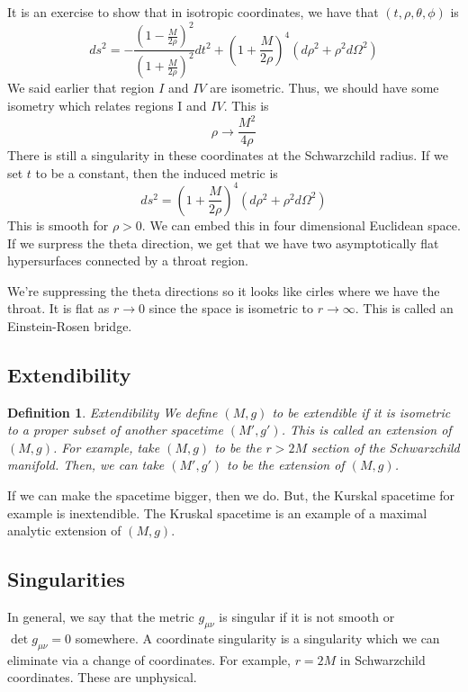 \documentclass[11pt, oneside]{article}   	%
\theoremstyle{slanted}
\newtheorem*{defn}{Definition}
\begin{document}
It is an exercise to show that 
in isotropic coordinates, 
we have that $ \left( t, \rho , \theta, \phi  \right)  $ 
is 
\[
ds ^ 2 =  - \frac{\left(  1- \frac{M}{2 \rho }  \right)  ^ 2 }{ 
\left(  1+ \frac{M}{2 \rho }  \right)  ^ 2 } dt ^ 2 
+ \left( 1 + \frac{M}{2 \rho }   \right)  ^ 4 
\left(  d \rho ^ 2 + \rho ^ 2 d \Omega^ 2  \right)  
\] We said earlier 
that region $ I  $ and $ I V $ are 
isometric. 
Thus, we should have some isometry which 
relates regions I and $ I V $. This is 
\[
\rho \to \frac{M^2}{4 \rho } 
\] There is still a singularity in 
these coordinates at the Schwarzchild radius. 
If we set $ t  $ to be a constant, 
then the induced metric 
is 
\[
ds ^2 = \left(  1 + \frac{M}{2 \rho }  \right)  ^ 4 
\left( d \rho ^ 2 + \rho ^ 2 d \Omega^ 2  \right) 
\] This is smooth for $ \rho > 0 $. 
We can embed this in four dimensional 
Euclidean space. 
If we surpress the theta direction, 
we get that we have 
two asymptotically flat hypersurfaces 
connected by a throat region. 

We're suppressing the theta directions 
so it looks like cirles where we have the throat. 
It is flat as $ r \to  0 $ since the space 
is isometric to $ r \to \infty $. 
This is called an Einstein-Rosen bridge. 

\subsection{Extendibility}
\begin{defn}{Extendibility}
We define $ \left( M , g  \right)   $ to be 
extendible if it is isometric 
to a proper subset of another spacetime $ \left( M ' , g ' \right)   $. 
This is called an extension of $ \left( M , g  \right)  $. 
For example, take $ \left( M , g  \right)  $ to be 
the $ r > 2M $ section of the Schwarzchild manifold. 
Then, we can take $ \left( M ' , g'  \right)  $ 
to be the extension of $ \left( M , g  \right)  $. 
\end{defn}
If we can make the spacetime bigger, 
then we do. But, 
the Kurskal spacetime for example is 
inextendible.
The Kruskal spacetime is an example 
of a maximal analytic extension of 
$ \left( M , g  \right)  $. 

\subsection{Singularities}
In general, we say that the metric 
$ g _{ \mu \nu } $ is singular if it is not 
smooth or $ \det g _{ \mu \nu }  = 0 $ somewhere. 
A coordinate singularity 
is a singularity which we can eliminate 
via a change of coordinates. For example, 
$ r = 2M $ in Schwarzchild coordinates. 
These are unphysical. 
\end{document}
